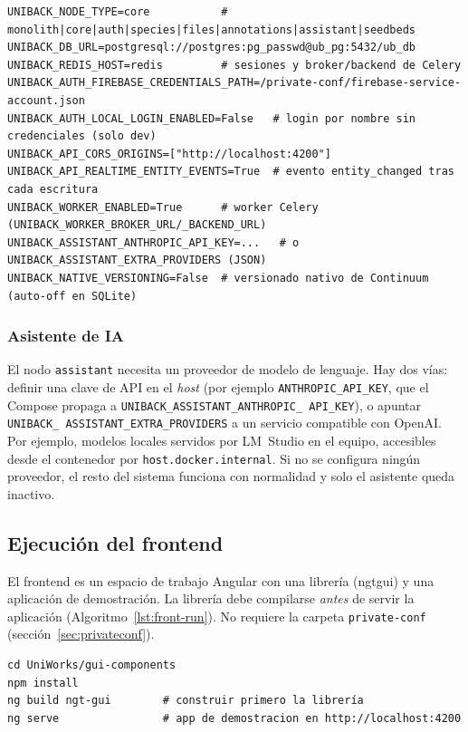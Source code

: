 \begin{lstlisting}[style=docker, caption={Variables de entorno principales (por prefijo)}, label={lst:env}]
UNIBACK_NODE_TYPE=core           # monolith|core|auth|species|files|annotations|assistant|seedbeds
UNIBACK_DB_URL=postgresql://postgres:pg_passwd@ub_pg:5432/ub_db
UNIBACK_REDIS_HOST=redis         # sesiones y broker/backend de Celery
UNIBACK_AUTH_FIREBASE_CREDENTIALS_PATH=/private-conf/firebase-service-account.json
UNIBACK_AUTH_LOCAL_LOGIN_ENABLED=False   # login por nombre sin credenciales (solo dev)
UNIBACK_API_CORS_ORIGINS=["http://localhost:4200"]
UNIBACK_API_REALTIME_ENTITY_EVENTS=True  # evento entity_changed tras cada escritura
UNIBACK_WORKER_ENABLED=True      # worker Celery (UNIBACK_WORKER_BROKER_URL/_BACKEND_URL)
UNIBACK_ASSISTANT_ANTHROPIC_API_KEY=...   # o UNIBACK_ASSISTANT_EXTRA_PROVIDERS (JSON)
UNIBACK_NATIVE_VERSIONING=False  # versionado nativo de Continuum (auto-off en SQLite)
\end{lstlisting}

\subsubsection{Asistente de IA}
El nodo \texttt{assistant} necesita un proveedor de modelo de lenguaje. Hay dos
vías: definir una clave de API en el \emph{host} (por ejemplo
\texttt{ANTHROPIC\_\allowbreak API\_\allowbreak KEY}, que el Compose propaga a
\texttt{UNIBACK\_\allowbreak ASSISTANT\_\allowbreak ANTHROPIC\_\allowbreak
API\_\allowbreak KEY}), o apuntar \texttt{UNIBACK\_\allowbreak
ASSISTANT\_\allowbreak EXTRA\_\allowbreak PROVIDERS} a un servicio compatible
con OpenAI. Por ejemplo, modelos locales servidos por LM~Studio en el equipo,
accesibles desde el contenedor por \texttt{host.docker.internal}. Si no se
configura ningún proveedor, el resto del sistema funciona con normalidad y solo
el asistente queda inactivo.

\subsection{Ejecución del frontend}
El frontend es un espacio de trabajo Angular con una librería
(\gls{ngtgui}) y una aplicación de demostración. La librería debe compilarse
\emph{antes} de servir la aplicación (Algoritmo~\ref{lst:front-run}). No
requiere la carpeta \texttt{private-conf}
(sección~\ref{sec:privateconf}).

\begin{lstlisting}[style=docker, caption={Arranque del frontend}, label={lst:front-run}]
cd UniWorks/gui-components
npm install
ng build ngt-gui        # construir primero la librería
ng serve                # app de demostracion en http://localhost:4200
\end{lstlisting}

